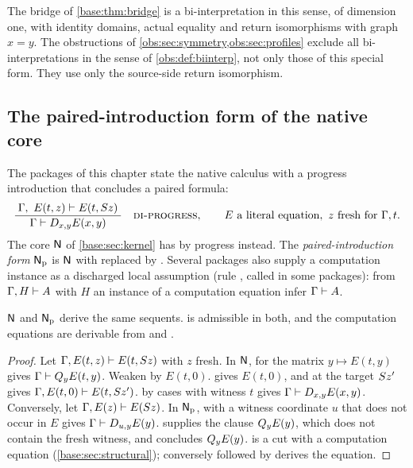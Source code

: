 The bridge of \cref{base:thm:bridge} is a bi-interpretation in this sense, of
dimension one, with identity domains, actual equality and return isomorphisms
with graph $x=y$. The obstructions of
\cref{obs:sec:symmetry,obs:sec:profiles} exclude all bi-interpretations in the
sense of \cref{obs:def:biinterp}, not only those of this special form. They
use only the source-side return isomorphism.

\subsection{The paired-introduction form of the native core}
\label{obs:sec:paired}

The packages of this chapter state the native calculus with a progress
introduction that concludes a paired formula:
\[
\infrule{\Gamma,\ E(t,z)\proves E(t,\Suc z)}{\Gamma\proves \D{x}{y}E(x,y)}
\quad\rulename{DI-progress},
\qquad E \text{ a literal equation},\ z \text{ fresh for } \Gamma,t.
\]
The core $\mathsf{N}$ of \cref{base:sec:kernel} has  by progress
instead. The \emph{paired-introduction form} $\mathsf{N}_{\mathrm{p}}$ is $\mathsf{N}$ with
 replaced by . Several packages also supply
a computation instance as a discharged local assumption (rule ,
called  in some packages): from $\Gamma,H\vdash A$ with $H$
an instance of a computation equation infer $\Gamma\vdash A$.

\begin{lemma}
\label{obs:lem:paired}
$\mathsf{N}$ and $\mathsf{N}_{\mathrm{p}}$ derive the same sequents.  is
admissible in both, and the computation equations are derivable from
 and .
\end{lemma}

\begin{proof}
Let $\Gamma,E(t,z)\vdash E(t,S z)$ with $z$ fresh. In $\mathsf{N}$,
 for the matrix $y\mapsto E(t,y)$ gives
$\Gamma\vdash Q_{y}E(t,y)$. Weaken by $E(t,0)$.  gives $E(t,0)$,
and  at the target $S z'$ gives
$\Gamma,E(t,0)\vdash E(t,S z')$.  by cases with witness $t$
gives $\Gamma\vdash D_{x,y}E(x,y)$. Conversely, let
$\Gamma,E(z)\vdash E(S z)$. In $\mathsf{N}_{\mathrm{p}}$, 
with a witness coordinate $u$ that does not occur in $E$ gives
$\Gamma\vdash D_{u,y}E(y)$.  supplies the clause $Q_{y}E(y)$,
which does not contain the fresh witness, and  concludes
$Q_{y}E(y)$.  is a cut with a computation equation
(\cref{base:sec:structural}); conversely  followed by
 derives the equation.
\end{proof}

